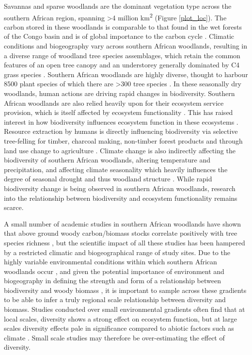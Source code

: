 \documentclass[11pt,a4paper]{article}
\begin{document}
Savannas and sparse woodlands are the dominant vegetation type across the southern African region, spanning >4 million km\textsuperscript{2} \citep{Ryan2016} (Figure \autoref{plot_loc}). The carbon stored in these woodlands is comparable to that found in the wet forests of the Congo basin and is of global importance to the carbon cycle \citep{}. Climatic conditions and biogeography vary across southern African woodlands, resulting in a diverse range of woodland tree species assemblages, which retain the common features of an open tree canopy and an understorey generally dominated by C4 grass species \citep{Frost1996}. Southern African woodlands are highly diverse, thought to harbour \textapprox{}8500 plant species of which there are >300 tree species \citep{Frost1996}. In these seasonally dry woodlands, human actions are driving rapid changes in biodiversity. Southern African woodlands are also relied heavily upon for their ecosystem service provision, which is itself affected by ecosystem functionality \citep{Schulze1994}. This has raised interest in how biodiversity influences ecosystem function in these ecosystems \citep{}. Resource extraction by humans is directly influencing biodiversity via selective tree-felling for timber, charcoal making, non-timber forest products and through land use change to agriculture \citep{ANOTHER, Ryan2016}. Climate change is also indirectly affecting the biodiversity of southern African woodlands, altering temperature and precipitation, and affecting climate seasonality which heavily influences the degree of seasonal drought and thus woodland structure \citep{}. While rapid biodiversity change is being observed in southern African woodlands, research into the relationship between biodiversity and ecosystem functionality remains scarce.

A small number of academic studies in southern African woodlands have shown that above ground woody carbon/biomass stocks correlate positively with tree species richness \citep{McNicol2018, Shirima2015, Mutowo2012}, but the scientific impact of all these studies has been hampered by a restricted climatic and biogeographical range of study sites. Due to the highly variable environmental conditions within which southern African woodlands occur \citep{Frost1996}, and given the potential importance of environment and biogeography in defining the strength and form of a relationship between biodiversity and woody biomass \citep{}, it is important to sample across these gradients to be able to infer a truly regional scale relationship between diversity and biomass. Studies conducted over small environmental gradients often find that at local scales, diversity shows a strong effect on ecosystem function, but at large scales diversity effects pale in significance compared to abiotic factors such as climate \citep{}. Small scale studies may therefore be over-estimating the effect of diversity.
\end{document}
